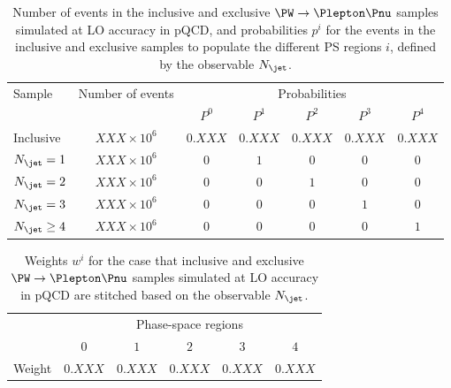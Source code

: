 \begin{table}[h!]
\begin{center}
\begin{tabular}{l|c|ccccc}
\hline
\multirow{2}{20mm}{Sample} & Number of events    & \multicolumn{5}{c}{Probabilities}               \\
                           &                     & $P^{0}$ & $P^{1}$ & $P^{2}$ & $P^{3}$ & $P^{4}$ \\
\hline
\hline
Inclusive                  & $XXX \times 10^{6}$ & $0.XXX$ & $0.XXX$ & $0.XXX$ & $0.XXX$ & $0.XXX$ \\
\hline
$N_{\jet} = 1$             & $XXX \times 10^{6}$ & $0$     & $1$     & $0$     & $0$     & $0$     \\
$N_{\jet} = 2$             & $XXX \times 10^{6}$ & $0$     & $0$     & $1$     & $0$     & $0$     \\
$N_{\jet} = 3$             & $XXX \times 10^{6}$ & $0$     & $0$     & $0$     & $1$     & $0$     \\
$N_{\jet} \geq 4$          & $XXX \times 10^{6}$ & $0$     & $0$     & $0$     & $0$     & $1$     \\
\hline
\end{tabular}
\end{center}
\caption{
  Number of events in the inclusive and exclusive $\PW \to \Plepton\Pnu$ samples simulated at LO accuracy in pQCD,
  and probabilities $p^{i}$ for the events in the inclusive and exclusive samples to populate the different PS regions $i$,
  defined by the observable $N_{\jet}$.
}
\label{tab:samples_and_probabilities_WJets_vs_Njet}
\end{table}

\begin{table}[h!]
\begin{center}
\begin{tabular}{l|ccccc}
\hline
 & \multicolumn{5}{c}{Phase-space regions} \\
 & $0$ & $1$ & $2$ & $3$ & $4$ \\
\hline
\hline
Weight & $0.XXX$ & $0.XXX$ & $0.XXX$ & $0.XXX$ & $0.XXX$ \\
\hline
\end{tabular}
\end{center}
\caption{
  Weights $w^{i}$ for the case that inclusive and exclusive $\PW \to \Plepton\Pnu$ samples simulated at LO accuracy in pQCD
  are stitched based on the observable $N_{\jet}$.
}
\label{tab:weights_WJets_vs_Njet}
\end{table}

